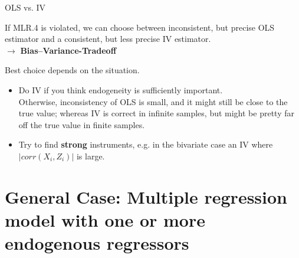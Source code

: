 \documentclass[11pt, aspectratio = 169]{beamer}
\begin{document}
\begin{frame}{OLS vs. IV}

If MLR.4 is violated, we can choose between inconsistent, but precise OLS estimator and a consistent, but less precise IV estimator. \\
$\rightarrow$ \textbf{\alert{Bias–Variance-Tradeoff}}

Best choice depends on the situation.

\begin{itemize}
    \item Do IV if you think endogeneity is sufficiently important. \\
    Otherwise, inconsistency of OLS is small, and it might still be close to the true value; whereas IV is correct in infinite samples, but might be pretty far off the true value in finite samples.
    \item Try to find \textbf{strong} instruments, e.g. in the bivariate case an IV where  $|corr(X_i, Z_i)|$ is large.
\end{itemize}
\end{frame}

\section{General Case: Multiple regression model with one or more endogenous regressors}
\end{document}
